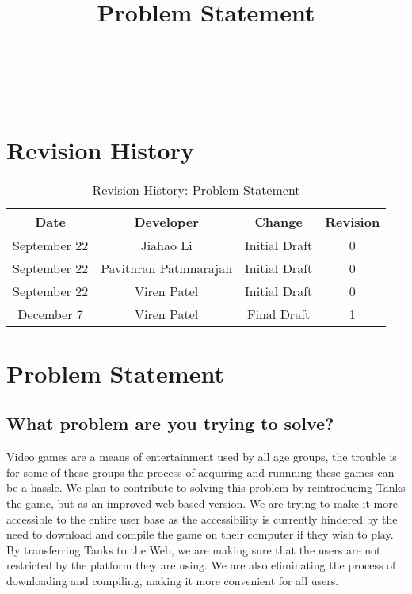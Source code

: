 \documentclass{article}
\begin{document}

\newpage

\title{Problem Statement}
\section*{\\\\Revision History}

\begin{table}[h!]
  \centering
  \caption{Revision History: Problem Statement}
  \label{tab:table1}
  \begin{tabular}{cccc}
	\toprule
	Date &  Developer & Change & Revision\\
	\midrule
	September 22&Jiahao Li &Initial Draft &0\\
	September 22&Pavithran Pathmarajah &Initial Draft &0\\
	September 22&Viren Patel  &Initial Draft &0\\
	December 7&Viren Patel &Final Draft&1\\
	\bottomrule
  \end{tabular}
\end{table}

\newpage

\section*{Problem Statement}

\subsection{What problem are you trying to solve?}
Video games are a means of entertainment used by all age groups, the trouble is for some of these groups the process of acquiring and runnning these games can be a hassle. We plan to contribute to solving this problem by reintroducing Tanks the game, but as an improved web based version. We are trying to make it more accessible to the entire user base as the accessibility is currently hindered by the need to download and compile the game on their computer if they wish to play. By transferring Tanks to the Web, we are making sure that the users are not restricted by the platform they are using. We are also eliminating the process of downloading and compiling, making it more convenient for all users. 
\end{document}
